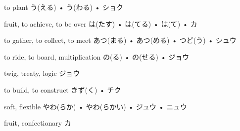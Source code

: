 



\setcounter{cardnum}{65}

		{to plant}
		{う(える) • う(わる) • ショク}
		{}{}
		{}{}
		{}{}
		{}{}
		{}{}

		{fruit, to achieve, to be over}
		{は(たす) • は(てる) • は(て) • カ}
		{}{}
		{}{}
		{}{}
		{}{}
		{}{}

		{to gather, to collect, to meet}
		{あつ(まる) • あつ(める) • つど(う) • シュウ}
		{}{}
		{}{}
		{}{}
		{}{}
		{}{}

		{to ride, to board, multiplication}
		{の(る) • の(せる) • ジョウ}
		{}{}
		{}{}
		{}{}
		{}{}
		{}{}

		{twig, treaty, logic}
		{ジョウ}
		{}{}
		{}{}
		{}{}
		{}{}
		{}{}

		{to build, to construct}
		{きず(く) • チク}
		{}{}
		{}{}
		{}{}
		{}{}
		{}{}

		{soft, flexible}
		{やわ(らか) • やわ(らかい) • ジュウ • ニュウ}
		{}{}
		{}{}
		{}{}
		{}{}
		{}{}

		{fruit, confectionary}
		{カ}
		{}{}
		{}{}
		{}{}
		{}{}
		{}{}

